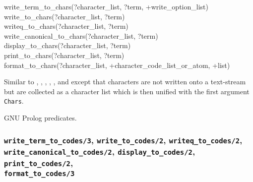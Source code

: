 \begin{TemplatesOneCol}
write\_term\_to\_chars(?character\_list, ?term, +write\_option\_list)\\
write\_to\_chars(?character\_list, ?term)\\
writeq\_to\_chars(?character\_list, ?term)\\
write\_canonical\_to\_chars(?character\_list, ?term)\\
display\_to\_chars(?character\_list, ?term)\\
print\_to\_chars(?character\_list, ?term)\\
format\_to\_chars(?character\_list, +character\_code\_list\_or\_atom, +list)

\end{TemplatesOneCol}

\Description

\texttt{}%
\texttt{}%
\texttt{}%
\texttt{}%
\texttt{}%
\texttt{}%
\texttt{}%
Similar to , , ,
, , 
 and   except that
characters are not written onto a text-stream but are collected as a
character list which is then unified with the first argument \texttt{Chars}.

\begin{PlErrors}


 


\end{PlErrors}

\Portability

GNU Prolog predicates.

\subsubsection{\texttt{write\_term\_to\_codes/3},
               \texttt{write\_to\_codes/2},
               \texttt{writeq\_to\_codes/2}, \\
               \texttt{write\_canonical\_to\_codes/2},
               \texttt{display\_to\_codes/2},
               \texttt{print\_to\_codes/2}, \\
               \texttt{format\_to\_codes/3}}


